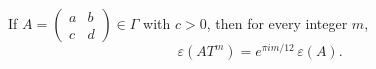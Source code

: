 If $A = \begin{pmatrix} a & b \\ c & d \end{pmatrix} \in \Gamma$ with $c > 0$, then for every integer $m$,
$$
\varepsilon(A T^m) = e^{\pi i m / 12} \, \varepsilon(A).
$$
